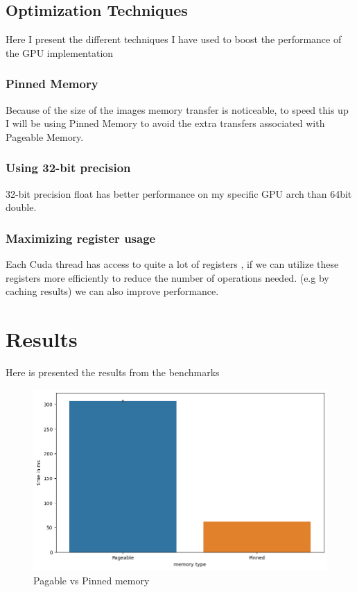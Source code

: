 \documentclass{article}
\begin{document}
\subsection{Optimization Techniques}%
\label{sub:optimization_techniques}

Here I present the different techniques I have used to boost the performance of the GPU
implementation

\subsubsection{Pinned Memory}%
\label{ssub:pinned_memory}

Because of the size of the images memory transfer is noticeable, to speed this up I will be
using Pinned Memory \cite{pinned memory} to avoid the extra transfers associated with Pageable Memory.

\subsubsection{Using 32-bit precision}%
\label{ssub:pinned_memory}

32-bit precision float has better performance on my specific GPU arch than 64bit double.

\subsubsection{Maximizing register usage}%
\label{ssub:maximizing_register_usage}

Each Cuda thread has access to quite a lot of registers \cite{cuda-registers}, if we can
utilize these registers more efficiently to reduce the number of operations needed. (e.g by
caching results) we can also improve performance.


\section{Results}%
\label{sec:results}

Here is presented the results from the benchmarks

\begin{figure}[H]
  \centering
  \includegraphics[width=0.98\linewidth]{read.png}
  \caption{Pagable vs Pinned memory}
  \label{fig:memory}
\end{figure}
\end{document}

